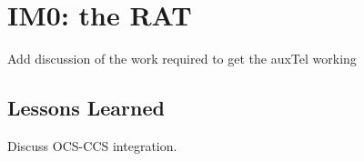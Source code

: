 \section{IM0: the \gls{RAT}}

Add discussion of the work required to get the auxTel working

\subsection{Lessons Learned}

Discuss \eg \gls{OCS}-\gls{CCS} integration.

